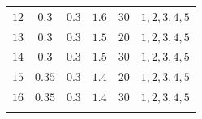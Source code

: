 \documentclass[journal]{IEEEtran}
\begin{document}
\begin{table}
{\begin{tabular}{lccccl}
      $12$             & $0.3$                     & $0.3 $                    & $1.6$                 & $30$          & $1,2,3,4,5$                   \\
      $13$             & $0.3$                     & $0.3 $                    & $1.5$                 & $20$          & $1,2,3,4,5$                   \\
      $14$             & $0.3$                     & $0.3 $                    & $1.5$                 & $30$          & $1,2,3,4,5$                   \\
      $15$             & $0.35$                    & $0.3 $                    & $1.4$                 & $20$          & $1,2,3,4,5$                   \\
      $16$             & $0.35$                    & $0.3 $                    & $1.4$                 & $30$          & $1,2,3,4,5$                   \\
      \bottomrule
      \label{tableB1}
    \end{tabular}}
\end{table}
\end{document}
